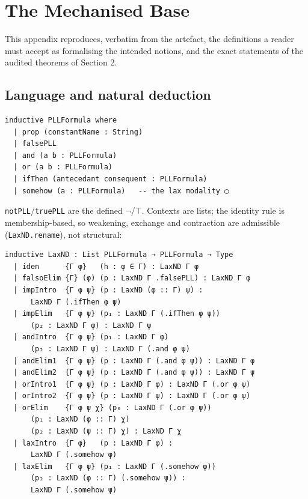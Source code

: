 
\section{The Mechanised Base}\label{app:base}

This appendix reproduces, verbatim from the artefact, the definitions a
reader must accept as formalising the intended notions, and the exact
statements of the audited theorems of Section 2.

\subsection{Language and natural deduction}

\begin{lstlisting}
inductive PLLFormula where
  | prop (constantName : String)
  | falsePLL
  | and (a b : PLLFormula)
  | or (a b : PLLFormula)
  | ifThen (antecedant consequent : PLLFormula)
  | somehow (a : PLLFormula)   -- the lax modality ◯
\end{lstlisting}

\noindent \texttt{notPLL}/\texttt{truePLL} are the defined
\ensuremath{\lnot}/\ensuremath{\top}. Contexts are lists; the identity rule is
membership-based, so weakening, exchange and contraction are admissible
(\texttt{LaxND.rename}), not structural:

\begin{lstlisting}
inductive LaxND : List PLLFormula → PLLFormula → Type
  | iden      {Γ φ}   (h : φ ∈ Γ) : LaxND Γ φ
  | falsoElim {Γ} (φ) (p : LaxND Γ .falsePLL) : LaxND Γ φ
  | impIntro  {Γ φ ψ} (p : LaxND (φ :: Γ) ψ) :
      LaxND Γ (.ifThen φ ψ)
  | impElim   {Γ φ ψ} (p₁ : LaxND Γ (.ifThen φ ψ))
      (p₂ : LaxND Γ φ) : LaxND Γ ψ
  | andIntro  {Γ φ ψ} (p₁ : LaxND Γ φ)
      (p₂ : LaxND Γ ψ) : LaxND Γ (.and φ ψ)
  | andElim1  {Γ φ ψ} (p : LaxND Γ (.and φ ψ)) : LaxND Γ φ
  | andElim2  {Γ φ ψ} (p : LaxND Γ (.and φ ψ)) : LaxND Γ ψ
  | orIntro1  {Γ φ ψ} (p : LaxND Γ φ) : LaxND Γ (.or φ ψ)
  | orIntro2  {Γ φ ψ} (p : LaxND Γ ψ) : LaxND Γ (.or φ ψ)
  | orElim    {Γ φ ψ χ} (p₀ : LaxND Γ (.or φ ψ))
      (p₁ : LaxND (φ :: Γ) χ)
      (p₂ : LaxND (ψ :: Γ) χ) : LaxND Γ χ
  | laxIntro  {Γ φ}   (p : LaxND Γ φ) :
      LaxND Γ (.somehow φ)
  | laxElim   {Γ φ ψ} (p₁ : LaxND Γ (.somehow φ))
      (p₂ : LaxND (φ :: Γ) (.somehow ψ)) :
      LaxND Γ (.somehow ψ)
\end{lstlisting}

